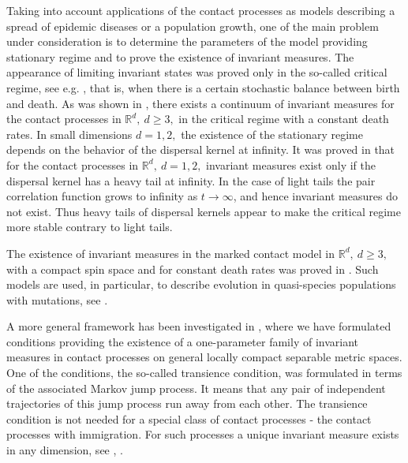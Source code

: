 \documentclass[a4paper,12pt]{article}
\newcommand{\R}{{\mathbb R}}
\newcommand{\X}{{\R^d}}
\begin{document}
Taking into account applications of the contact processes as models describing a spread of epidemic diseases or a population growth, one of the main problem under consideration is to determine the parameters of the model providing stationary regime and to prove the existence of invariant measures.  The appearance of limiting invariant states was proved only in the so-called critical regime, see e.g. \cite{PZ-EJP, PZ-PPI}, that is, when there is a certain stochastic  balance between birth and death.
As was shown in \cite{KKP}, there exists a continuum of invariant measures for the contact processes in $\X, \ d\ge 3,$ in the critical regime with a constant death rates. In small dimensions $d=1,2,$ the existence of the stationary regime depends on the behavior of the dispersal kernel at infinity. It was proved in \cite{KKPZ} that for the contact processes in $\X, \ d= 1,2,$ invariant measures exist only if the dispersal kernel has a heavy tail at infinity. In the case of light tails the pair correlation function grows to infinity as $t \to \infty$, and hence invariant measures do not exist. Thus heavy tails of dispersal kernels appear to make the critical regime more stable contrary to light tails.

The existence of invariant measures in the marked contact model in $\X, \ d\ge 3,$ with a compact spin space and for constant death rates was proved in \cite{KPZh}. Such models are used, in particular, to describe evolution in quasi-species populations with mutations, see \cite{Nov}.

A more general framework has been investigated in \cite{PZ-EJP}, where we have formulated conditions providing the existence of a one-parameter family of invariant measures in contact processes on general locally compact separable metric spaces. One of the conditions, the so-called transience condition, was formulated in terms of the associated Markov jump process. It means that any pair of independent trajectories of this jump process run away from each other. The transience condition is not needed for a special class of contact processes - the contact processes with immigration. For such processes a unique invariant measure exists in any dimension, see \cite{CHM}, \cite{PZh-MMJ}.


\end{document}
